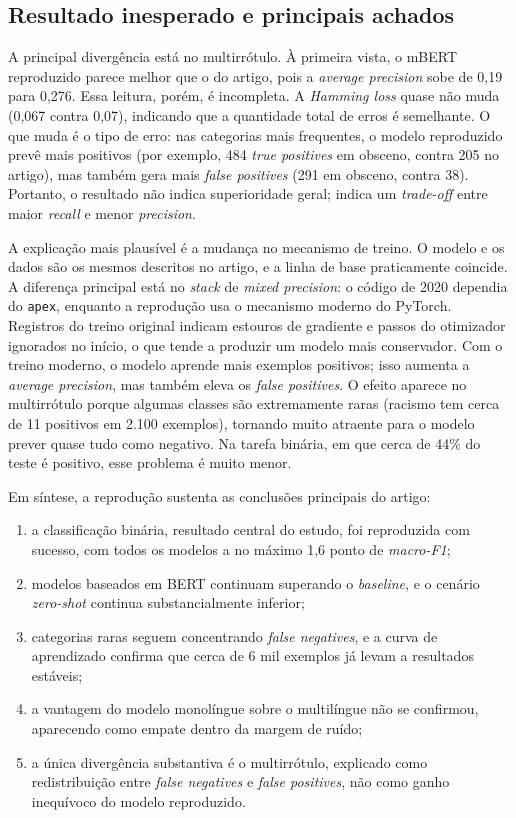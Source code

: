 \documentclass[sigconf, nonacm]{acmart}
\begin{document}
\subsection{Resultado inesperado e principais achados}
\label{sec:res-achados}
 
A principal divergência está no multirrótulo. À primeira vista, o mBERT
reproduzido parece melhor que o do artigo, pois a \emph{average precision}
sobe de 0,19 para 0,276. Essa leitura, porém, é incompleta. A \emph{Hamming
loss} quase não muda (0,067 contra 0,07), indicando que a quantidade total
de erros é semelhante. O que muda é o tipo de erro: nas categorias mais
frequentes, o modelo reproduzido prevê mais positivos (por exemplo, 484
\emph{true positives} em obsceno, contra 205 no artigo), mas também gera
mais \emph{false positives} (291 em obsceno, contra 38). Portanto, o resultado
não indica superioridade geral; indica um \emph{trade-off} entre maior
\emph{recall} e menor \emph{precision}.

A explicação mais plausível é a mudança no mecanismo de treino. O modelo e
os dados são os mesmos descritos no artigo, e a linha de base praticamente
coincide. A diferença principal está no \emph{stack} de \emph{mixed precision}: o
código de 2020 dependia do \texttt{apex}, enquanto a reprodução usa o
mecanismo moderno do PyTorch. Registros do treino original indicam estouros
de gradiente e passos do otimizador ignorados no início, o que tende a
produzir um modelo mais conservador. Com o treino moderno, o modelo aprende
mais exemplos positivos; isso aumenta a \emph{average precision}, mas também
eleva os \emph{false positives}. O efeito aparece no multirrótulo porque algumas
classes são extremamente raras (racismo tem cerca de 11 positivos em 2.100
exemplos), tornando muito atraente para o modelo prever quase tudo como
negativo. Na tarefa binária, em que cerca de 44\% do teste é positivo, esse
problema é muito menor.

Em síntese, a reprodução sustenta as conclusões principais do artigo:
\begin{enumerate}
  \item a classificação binária, resultado central do estudo, foi reproduzida
        com sucesso, com todos os modelos a no máximo 1,6 ponto de
        \emph{macro-F1};
  \item modelos baseados em BERT continuam superando o \emph{baseline}, e o
        cenário \emph{zero-shot} continua substancialmente inferior;
  \item categorias raras seguem concentrando \emph{false negatives}, e a curva de
        aprendizado confirma que cerca de 6 mil exemplos já levam a
        resultados estáveis;
  \item a vantagem do modelo monolíngue sobre o multilíngue não se confirmou,
        aparecendo como empate dentro da margem de ruído;
  \item a única divergência substantiva é o multirrótulo, explicado como
        redistribuição entre \emph{false negatives} e \emph{false positives}, não como
        ganho inequívoco do modelo reproduzido.
\end{enumerate}
 
\end{document}
